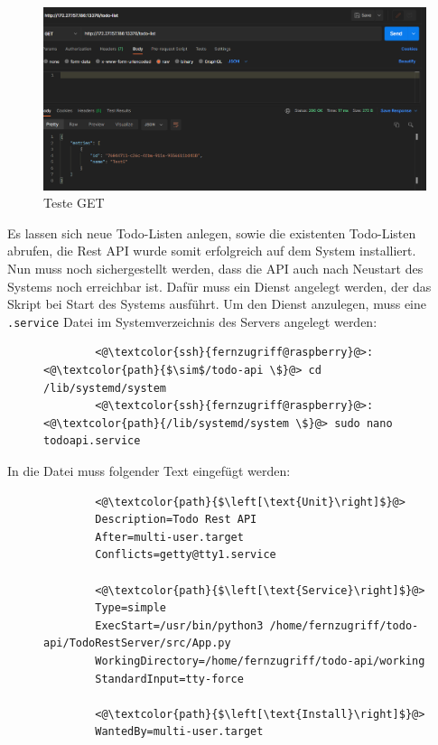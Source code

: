 \documentclass[a4paper, 12pt]{scrartcl}
\begin{document}
\begin{figure}[H]
    \begin{center}
        \includegraphics[scale=0.4]{Bilder/api_postman_test_get.png}
        \caption{Teste GET}\label{pic:api_postman_test_get}
    \end{center}
\end{figure}
Es lassen sich neue Todo-Listen anlegen, sowie die existenten Todo-Listen abrufen, die Rest API wurde somit erfolgreich auf dem System installiert.
\\
Nun muss noch sichergestellt werden, dass die API auch nach Neustart des Systems noch erreichbar ist. Dafür muss ein Dienst angelegt werden, der das Skript bei Start
des Systems ausführt. Um den Dienst anzulegen, muss eine \lstinline[basicstyle={\small\ttfamily\color{black}}]|.service| Datei im Systemverzeichnis des Servers angelegt
werden:
\begin{figure}[H]
    \begin{mdframed}[backgroundcolor=bbg]
        \begin{lstlisting}
        <@\textcolor{ssh}{fernzugriff@raspberry}@>:<@\textcolor{path}{$\sim$/todo-api \$}@> cd /lib/systemd/system
        <@\textcolor{ssh}{fernzugriff@raspberry}@>:<@\textcolor{path}{/lib/systemd/system \$}@> sudo nano todoapi.service
        \end{lstlisting}
    \end{mdframed}
    \label{lst:create_service_file}
\end{figure}
In die Datei muss folgender Text eingefügt werden:
\begin{figure}[H]
    \begin{mdframed}[backgroundcolor=bbg]
        \begin{lstlisting}
        <@\textcolor{path}{$\left[\text{Unit}\right]$}@>
        Description=Todo Rest API
        After=multi-user.target
        Conflicts=getty@tty1.service

        <@\textcolor{path}{$\left[\text{Service}\right]$}@>
        Type=simple
        ExecStart=/usr/bin/python3 /home/fernzugriff/todo-api/TodoRestServer/src/App.py
        WorkingDirectory=/home/fernzugriff/todo-api/working
        StandardInput=tty-force

        <@\textcolor{path}{$\left[\text{Install}\right]$}@>
        WantedBy=multi-user.target
        \end{lstlisting}
    \end{mdframed}
    \label{lst:service_file}
\end{figure}
\end{document}
